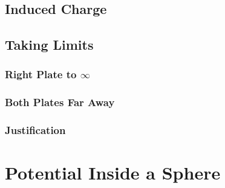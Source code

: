 \documentclass[12pt]{article}
\begin{document}
\subsection{Induced Charge}

\subsection{Taking Limits}

\subsubsection{Right Plate to $\infty$}

\subsubsection{Both Plates Far Away}

\subsubsection{Justification}

\section{Potential Inside a Sphere}
\end{document}
